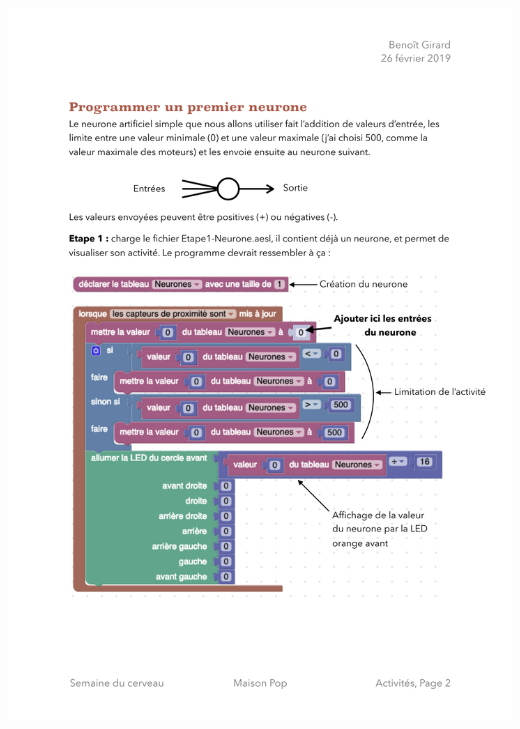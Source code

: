 \documentclass[12pt]{article}
\begin{document}
\includegraphics{../ProgrammeEtape1.pdf}
\end{document}

